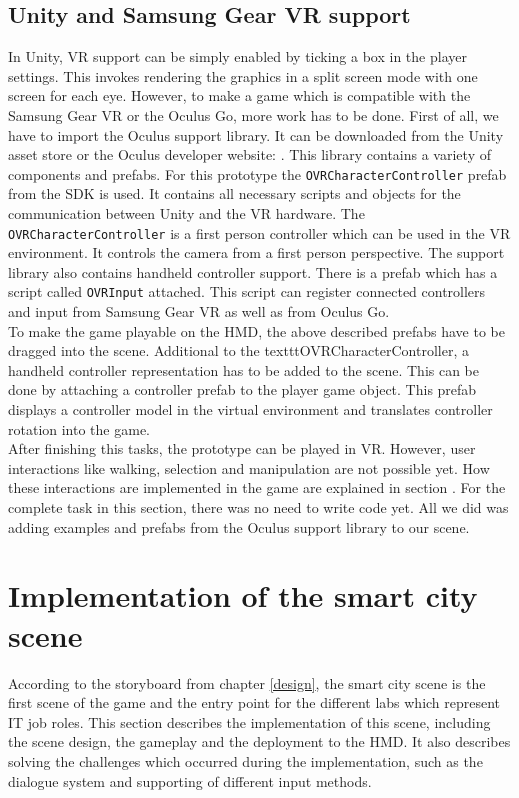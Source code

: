 \subsection{Unity and Samsung Gear VR support} \label{gearvrsupport}
In Unity, VR support can be simply enabled by ticking a box in the player settings. This invokes rendering the graphics in a split screen mode with one screen for each eye. However, to make a game which is compatible with the Samsung Gear VR or the Oculus Go, more work has to be done. First of all, we have to import the Oculus support library. It can be downloaded from the Unity asset store or the Oculus developer website: \cite{Occulus.2018}. This library contains a variety of components and prefabs. For this prototype the \texttt{OVRCharacterController} prefab from the SDK is used. It contains all necessary scripts and objects for the communication between Unity and the VR hardware. The \texttt{OVRCharacterController} is a first person controller which can be used in the VR environment. It controls the camera from a first person perspective. The support library also contains handheld controller support. There is a prefab which has a script called \texttt{OVRInput} attached. This script can register connected controllers and input from Samsung Gear VR as well as from Oculus Go.\\
To make the game playable on the HMD, the above described prefabs have to be dragged into the scene. Additional to the  texttt{OVRCharacterController}, a handheld controller representation has to be added to the scene. This can be done by attaching a controller prefab to the player game object. This prefab displays a controller model in the virtual environment and translates controller rotation into the game.\\ After finishing this tasks, the prototype can be played in VR. However, user interactions like walking, selection and manipulation are not possible yet. How these interactions are implemented in the game are explained in section \label{inputmethods}. For the complete task in this section, there was no need to write code yet. All we did was adding examples and prefabs from the Oculus support library to our scene.
\newpage
\section{Implementation of the smart city scene}
According to the storyboard from chapter \ref{design}, the smart city scene is the first scene of the game and the entry point for the different labs which represent IT job roles. This section describes the implementation of this scene, including the scene design, the gameplay and the deployment to the HMD. It also describes solving the challenges which occurred during the implementation, such as the dialogue system and supporting of different input methods.
